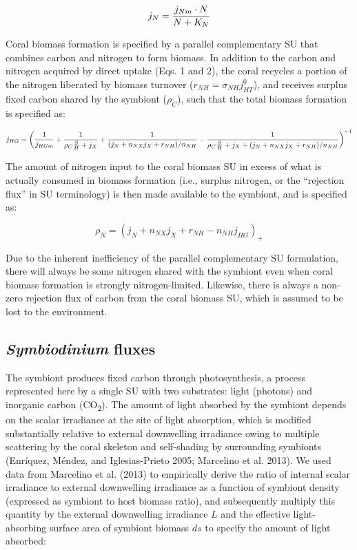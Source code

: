 \documentclass[]{elsarticle} %
\begin{document}
\begin{equation} j_N = {{j_{Nm} \cdot N} \over {N + K_N}} \end{equation}

Coral biomass formation is specified by a parallel complementary SU that
combines carbon and nitrogen to form biomass. In addition to the carbon
and nitrogen acquired by direct uptake (Eqs. 1 and 2), the coral
recycles a portion of the nitrogen liberated by biomass turnover
(\(r_{NH}=\sigma_{NH}j_{HT}^0\)), and receives surplus fixed carbon
shared by the symbiont (\(\rho_C\)), such that the total biomass
formation is specified as:

\begin{equation} j_{HG} = \bigg({1 \over j_{HGm}} + {1 \over {\rho_C{S \over H} + j_X}} + {1 \over {(j_N + n_{NX}j_X + r_{NH}) / n_{NH}}} - {1 \over {{\rho_C{S \over H} + j_X} + (j_N + n_{NX}j_X + r_{NH}) / n_{NH}}}\bigg)^{-1} \end{equation}

The amount of nitrogen input to the coral biomass SU in excess of what
is actually consumed in biomass formation (i.e., surplus nitrogen, or
the ``rejection flux'' in SU terminology) is then made available to the
symbiont, and is specified as:

\begin{equation} \rho_N = (j_N + n_{NX}j_X + r_{NH} - n_{NH}j_{HG})_+ \end{equation}

Due to the inherent inefficiency of the parallel complementary SU
formulation, there will always be some nitrogen shared with the symbiont
even when coral biomass formation is strongly nitrogen-limited.
Likewise, there is always a non-zero rejection flux of carbon from the
coral biomass SU, which is assumed to be lost to the environment.

\subsection{\texorpdfstring{\emph{Symbiodinium}
fluxes}{Symbiodinium fluxes}}\label{symbiodinium-fluxes}

The symbiont produces fixed carbon through photosynthesis, a process
represented here by a single SU with two substrates: light (photons) and
inorganic carbon (CO\textsubscript{2}). The amount of light absorbed by
the symbiont depends on the scalar irradiance at the site of light
absorption, which is modified substantially relative to external
downwelling irradiance owing to multiple scattering by the coral
skeleton and self-shading by surrounding symbionts (Enríquez, Méndez,
and Iglesias-Prieto 2005; Marcelino et al. 2013). We used data from
Marcelino et al. (2013) to empirically derive the ratio of internal
scalar irradiance to external downwelling irradiance as a function of
symbiont density (expressed as symbiont to host biomass ratio), and
subsequently multiply this quantity by the external downwelling
irradiance \(L\) and the effective light-absorbing surface area of
symbiont biomass \(ds\) to specify the amount of light absorbed:
\end{document}
